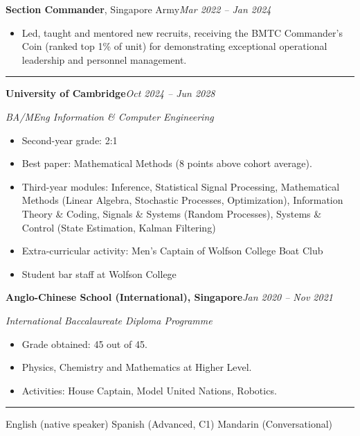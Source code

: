 \documentclass[11pt]{article}
\newcommand{\cvsection}[1]{%
  \vspace{10pt}%
  \noindent{\large\bfseries\MakeUppercase{#1}}\par
  \vspace{-4pt}\noindent\rule{\linewidth}{0.7pt}\vspace{4pt}%
}
\newcommand{\sep}{\quad\textbar\quad}
\begin{document}
\vspace{4pt}
\newpage
\noindent\textbf{Section Commander}, Singapore Army\hfill\textit{Mar 2022 -- Jan 2024}\par
\begin{itemize}
  \item Led, taught and mentored new recruits, receiving the BMTC Commander's Coin (ranked top 1\% of unit) for demonstrating exceptional operational leadership and personnel management.
\end{itemize}

\cvsection{Education}

\noindent\textbf{University of Cambridge}\hfill\textit{Oct 2024 -- Jun 2028}\par
\textit{BA/MEng Information \& Computer Engineering}
\begin{itemize}
  \item Second-year grade: 2:1
  \item Best paper: Mathematical Methods (8 points above cohort average).
  \item Third-year modules: Inference, Statistical Signal Processing, Mathematical Methods (Linear Algebra, Stochastic Processes, Optimization), Information Theory \& Coding, Signals \& Systems (Random Processes), Systems \& Control (State Estimation, Kalman Filtering)
  \item Extra-curricular activity: Men's Captain of Wolfson College Boat Club
  \item Student bar staff at Wolfson College
\end{itemize}

\vspace{4pt}
\noindent\textbf{Anglo-Chinese School (International), Singapore}\hfill\textit{Jan 2020 -- Nov 2021}\par
\textit{International Baccalaureate Diploma Programme}
\begin{itemize}
  \item Grade obtained: 45 out of 45.
  \item Physics, Chemistry and Mathematics at Higher Level.
  \item Activities: House Captain, Model United Nations, Robotics.
\end{itemize}

\cvsection{Languages}
English (native speaker) \sep Spanish (Advanced, C1) \sep Mandarin (Conversational)
\end{document}
